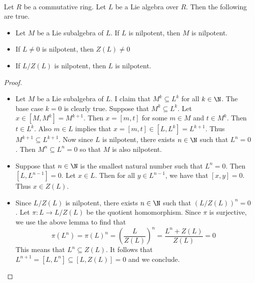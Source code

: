 \documentclass[a4paper]{article}
\begin{document}
\begin{lmm}{}{}\\
Let $R$ be a commutative ring. Let $L$ be a Lie algebra over $R$. Then the following are true. 
\begin{itemize}
\item Let $M$ be a Lie subalgebra of $L$. If $L$ is nilpotent, then $M$ is nilpotent. 
\item If $L\neq 0$ is nilpotent, then $Z(L)\neq 0$
\item If $L/Z(L)$ is nilpotent, then $L$ is nilpotent. 
\end{itemize} 
\begin{proof}~\\
\begin{itemize}
\item Let $M$ be a Lie subalgebra of $L$. I claim that $M^k\subseteq L^k$ for all $k\in\N$. The base case $k=0$ is clearly true. Suppose that $M^k\subseteq L^k$. Let $x\in[M,M^k]=M^{k+1}$. Then $x=[m,t]$ for some $m\in M$ and $t\in M^k$. Then $t\in L^k$. Also $m\in L$ implies that $x=[m,t]\in[L,L^k]=L^{k+1}$. Thus $M^{k+1}\subseteq L^{k+1}$. Now since $L$ is nilpotent, there exists $n\in\N$ such that $L^n=0$. Then $M^n\subseteq L^n=0$ so that $M$ is also nilpotent. 
\item Suppose that $n\in\N$ is the smallest natural number such that $L^n=0$. Then $[L,L^{n-1}]=0$. Let $x\in L$. Then for all $y\in L^{n-1}$, we have that $[x,y]=0$. Thus $x\in Z(L)$. 
\item Since $L/Z(L)$ is nilpotent, there exists $n\in\N$ such that $(L/Z(L))^n=0$. Let $\pi:L\to L/Z(L)$ be the quotient homomorphism. Since $\pi$ is surjective, we use the above lemma to find that $$\pi(L^n)=\pi(L)^n=\left(\frac{L}{Z(L)}\right)^n=\frac{L^n+Z(L)}{Z(L)}=0$$ This means that $L^n\subseteq Z(L)$. It follows that $L^{n+1}=[L,L^n]\subseteq[L,Z(L)]=0$ and we conclude. 
\end{itemize}
\end{proof}
\end{lmm}
\end{document}
